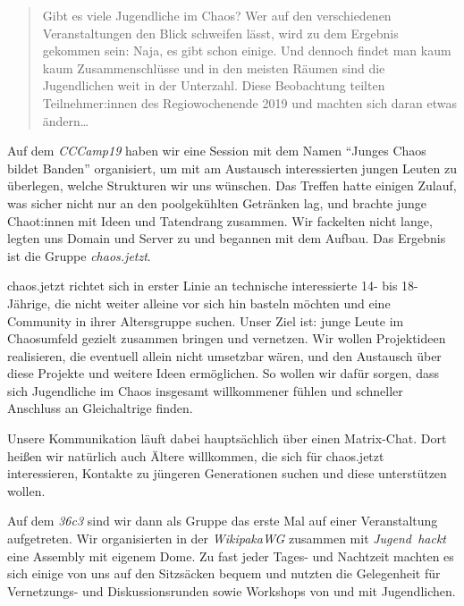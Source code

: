 \begin{DSarticle}[
    title={chaos.jetzt},
    author={dc7ia=lektorat@dc7ia.eu, ruru4143=ruru-cj-ds@r3.at, raketenlurch=raketenlurch@riseup.net}
    head=chaos.jetzt,
    tocentry=chaos.jetzt,
]

\begin{abstract}
Gibt es viele Jugendliche im Chaos?
Wer auf den verschiedenen Veranstaltungen den Blick schweifen lässt, wird zu dem Ergebnis gekommen sein:
Naja, es gibt schon einige.
Und dennoch findet man kaum kaum Zusammenschlüsse und in den meisten Räumen sind die Jugendlichen weit in der Unterzahl.
Diese Beobachtung teilten Teilnehmer:innen des Regiowochenende 2019 und machten sich daran etwas ändern\ldots
\end{abstract}


Auf dem \emph{CCCamp19} haben wir eine Session mit dem Namen \enquote{Junges Chaos bildet Banden} organisiert, um mit am Austausch interessierten jungen Leuten zu überlegen, welche Strukturen wir uns wünschen.
Das Treffen hatte einigen Zulauf, was sicher nicht nur an den poolgekühlten Getränken lag, und brachte junge Chaot:innen mit Ideen und Tatendrang zusammen.
Wir fackelten nicht lange, legten uns Domain und Server zu und begannen mit dem Aufbau. Das Ergebnis ist die Gruppe \emph{chaos.jetzt}.

chaos.jetzt richtet sich in erster Linie an technische interessierte 14- bis 18-Jährige, die nicht weiter alleine vor sich hin basteln möchten und eine Community in ihrer Altersgruppe suchen.
Unser Ziel ist: junge Leute im Chaosumfeld gezielt zusammen bringen und vernetzen.
Wir wollen Projektideen realisieren, die eventuell allein nicht umsetzbar wären, und den Austausch über diese Projekte und weitere Ideen ermöglichen.
So wollen wir dafür sorgen, dass sich Jugendliche im Chaos insgesamt willkommener fühlen und schneller Anschluss an Gleichaltrige finden.

Unsere Kommunikation läuft dabei hauptsächlich über einen Matrix-Chat.
Dort heißen wir natürlich auch Ältere willkommen, die sich für chaos.jetzt interessieren, Kontakte zu jüngeren Generationen suchen und diese unterstützen wollen.

Auf dem \emph{36c3} sind wir dann als Gruppe das erste Mal auf einer Veranstaltung aufgetreten.
Wir organisierten in der \emph{WikipakaWG} zusammen mit \emph{Jugend~hackt} eine Assembly mit eigenem Dome.
Zu fast jeder Tages- und Nachtzeit machten es sich einige von uns auf den Sitzsäcken bequem und nutzten die Gelegenheit für Vernetzungs- und Diskussionsrunden sowie Workshops von und mit Jugendlichen.


\end{DSarticle}
